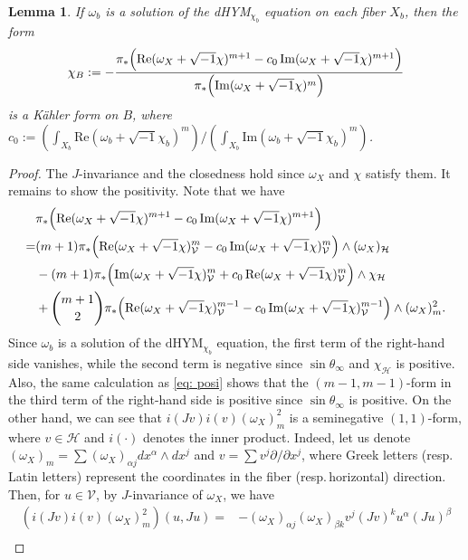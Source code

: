 \documentclass{amsart}
\numberwithin{equation}{section}
\theoremstyle{plain}
\newtheorem{lemma}[equation]{Lemma}
\theoremstyle{definition}
\theoremstyle{remark}
\begin{document}
\begin{lemma}\label{lem:dhymkahler}
    If $\omega_b$ is a solution of the dHYM$_{\chi_b}$ equation on each fiber $X_b$, then the form 
    $$\chi_B:=-\frac{\pi_*\Bigl(\mathrm{Re}(\omega_X+\sqrt{-1}\chi)^{m+1}-{c_0}\,\mathrm{Im}(\omega_X+\sqrt{-1}\chi)^{m+1}\Bigr)}{\pi_*\Bigl(\mathrm{Im}(\omega_X+\sqrt{-1}\chi)^m\Bigr)}$$
    is a K{\"a}hler form on $B$, where $c_0:=(\int_{X_b}\mathrm{Re}(\omega_b+\sqrt{-1}\chi_b)^m)/(\int_{X_b}\mathrm{Im}(\omega_b+\sqrt{-1}\chi_b)^m)$. 
\end{lemma}

\begin{proof}
The $J$-invariance and the closedness hold since $\omega_X$ and $\chi$ satisfy them. It remains to show the positivity.
Note that we have
\begin{align*}
    &\pi_*\Bigl(\mathrm{Re}(\omega_X+\sqrt{-1}\chi)^{m+1}-c_0\,\mathrm{Im}(\omega_X+\sqrt{-1}\chi)^{m+1}\Bigr)\\
    =&(m+1)\pi_*\Big(\mathrm{Re}(\omega_X+\sqrt{-1}\chi)_\mathcal{V}^m-c_0\,\mathrm{Im}(\omega_X+\sqrt{-1}\chi)_\mathcal{V}^m\Big)\wedge(\omega_X)_\mathcal{H}\\
    &-(m+1)\pi_*\Big(\mathrm{Im}(\omega_X+\sqrt{-1}\chi)_\mathcal{V}^m+c_0\,\mathrm{Re}(\omega_X+\sqrt{-1}\chi)_\mathcal{V}^m\Big)\wedge\chi_\mathcal{H}\\
    &+{m+1\choose2}\pi_*\Bigl(\mathrm{Re}(\omega_X+\sqrt{-1}\chi)_\mathcal{V}^{m-1}-c_0\,\mathrm{Im}(\omega_X+\sqrt{-1}\chi)_\mathcal{V}^{m-1}\Bigr)\wedge(\omega_X)_m^2.
\end{align*}
Since $\omega_b$ is a solution of the $\mathrm{dHYM}_{\chi_b}$ equation, the first term of the right-hand side vanishes, while the second term is negative since $\sin{\theta_\infty}$ and $\chi_\mathcal{H}$ is positive. Also, the same calculation as \eqref{eq: posi} shows that the $(m-1,m-1)$-form in the third term of the right-hand side is positive since $\sin\theta_\infty$ is positive. On the other hand, we can see that $i(Jv)i(v)(\omega_X)^2_m$ is a seminegative $(1,1)$-form, where $v\in \mathcal{H}$ and $i(\cdot)$ denotes the inner product. Indeed, let us denote 
$(\omega_X)_m=\sum (\omega_X)_{\alpha j}dx^\alpha\wedge dx^j$ and $v=\sum 
v^j\partial/\partial x^j$, 
where Greek letters (resp.\,Latin letters) represent the coordinates in the fiber (resp.\,horizontal) direction. Then, for $u\in\mathcal{V}$, by $J$-invariance of $\omega_X$, we have
\begin{align*}
    \left(i(Jv)i(v)(\omega_X)_m^2\right)(u,Ju)=&-(\omega_X)_{\alpha j}(\omega_X)_{\beta k} v^j (Jv)^k u^\alpha (Ju)^\beta\\

\end{align*}
\end{proof}
\end{document}

